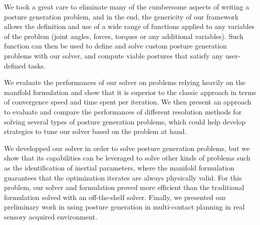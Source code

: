 We took a great care to eliminate many of the cumbersome aspects of writing a posture generation problem, and in the end, the genericity of our framework allows the definition and use of a wide range of functions applied to any variables of the problem (joint angles, forces, torques or any additional variables).
Such function can then be used to define and solve custom posture generation problems with our solver, and compute viable postures that satisfy any user-defined tasks.

We evaluate the performances of our solver on problems relying heavily on the manifold formulation and show that it is superior to the classic approach in terms of convergence speed and time spent per iteration.
We then present an approach to evaluate and compare the performances of different resolution methods for solving several types of posture generation problems, which could help develop strategies to tune our solver based on the problem at hand.

We developped our solver in order to solve posture generation problems, but we show that its capabilities can be leveraged to solve other kinds of problems such as the identification of inertial parameters, where the manifold formulation guarantees that the optimization iterates are always physically valid.
For this problem, our solver and formulation proved more efficient than the traditional formulation solved with an off-the-shelf solver.
Finally, we presented our preliminary work in using posture generation in multi-contact planning in real sensory acquired environment.


